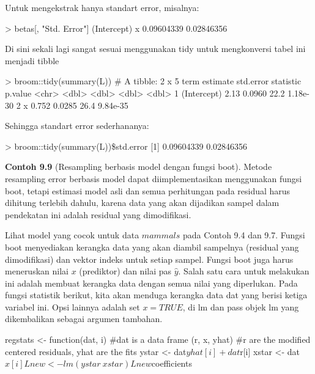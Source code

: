 \documentclass[a4paper,12pt]{article}
\theoremstyle{definition}
\begin{document}
Untuk mengekstrak hanya standart error, misalnya:

\begin{spverbatim}
> betas[, "Std. Error"]
(Intercept)         x
0.09604339  0.02846356
\end{spverbatim}

Di sini sekali lagi sangat sesuai menggunakan tidy untuk mengkonversi tabel ini menjadi tibble

\begin{spverbatim}
> broom::tidy(summary(L))
# A tibble: 2 x 5
    term        estimate    std.error   statistic     p.value
    <chr>       <dbl>           <dbl>       <dbl>       <dbl>
1 (Intercept)   2.13        0.0960          22.2      1.18e-30
2 x             0.752       0.0285          26.4      9.84e-35
\end{spverbatim}

Sehingga standart error sederhananya:

\begin{spverbatim}
> broom::tidy(summary(L))\$std.error
[1] 0.09604339 0.02846356

\end{spverbatim}

\textbf{Contoh 9.9} (Resampling berbasis model dengan fungsi boot). Metode resampling error berbasis model dapat diimplementasikan menggunakan fungsi boot, tetapi estimasi model asli dan semua perhitungan pada residual harus dihitung terlebih dahulu, karena data yang akan dijadikan sampel dalam pendekatan ini adalah residual yang dimodifikasi.

Lihat model yang cocok untuk data $mammals$ pada Contoh 9.4 dan 9.7. Fungsi boot menyediakan kerangka data yang akan diambil sampelnya (residual yang dimodifikasi) dan vektor indeks untuk setiap sampel. Fungsi boot juga harus meneruskan nilai $x$ (prediktor) dan nilai pas $\widehat{y}$. Salah satu cara untuk melakukan ini adalah membuat kerangka data dengan semua nilai yang diperlukan. Pada fungsi statistik berikut, kita akan menduga kerangka data dat yang berisi ketiga variabel ini. Opsi lainnya adalah set $x=TRUE$, di lm dan pass objek lm yang dikembalikan sebagai argumen tambahan.

\begin{spverbatim}
regstats <- function(dat, i) {
  #dat is a data frame (r, x, yhat)
  #r are the modified centered residuals, yhat are the fits
  ystar <- dat$yhat[i] + dat$r[i]
  xstar <- dat$x[i]
  Lnew <- lm(ystar ~ xstar)
  Lnew$coefficients
}
\end{spverbatim}
\end{document}
